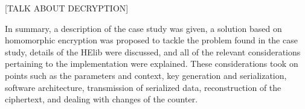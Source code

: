 [TALK ABOUT DECRYPTION]

In summary, a description of the case study was given, a solution based on homomorphic encryption was proposed to tackle the problem found in the case study, details of the HElib were discussed, and all of the relevant considerations pertaining to the implementation were explained. These considerations took on points such as the parameters and context, key generation and serialization, software architecture, transmission of serialized data, reconstruction of the ciphertext, and dealing with changes of the counter. 


\clearpage
